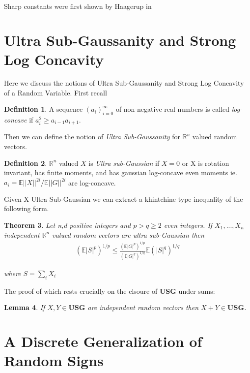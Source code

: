 \documentclass[10pt]{article}
\newcommand{\E}{\mathbb{E}}
\newcommand{\1}{\textbf{1}}
\newcommand{\R}{\mathbb{R}}
\newcommand{\norm}[1]{||#1||}
\newtheorem{theorem}{Theorem}
\newtheorem{lemma}[theorem]{Lemma}
\theoremstyle{remark}
\theoremstyle{definition}
\newtheorem{defn}[theorem]{Definition}
\begin{document}
Sharp constants were first shown by Haagerup in \cite{H}



\section{Ultra Sub-Gaussanity and Strong Log Concavity}

Here we discuss the notions of Ultra Sub-Gaussanity and Strong Log Concavity of a Random Variable. First recall

\begin{defn}
	A sequence $(a_i)_{i=0}^{\infty}$ of non-negative real numbers is called \textit{log-concave} if $a_i^2 \geq a_{i-1}a_{i+1}$.
\end{defn}

Then we can define the notion of \textit{Ultra Sub-Gaussanity} for $\R^n$ valued random vectors.

\begin{defn}
	$\R^n$ valued $X$ is \textit{Ultra sub-Gaussian} if $X=0$ or X is rotation invariant, has finite moments, and has gaussian log-concave even moments ie. $a_i = \E \norm{X}^{2i}/\E \norm{G}^{2i}$ are log-concave.
\end{defn}

Given X Ultra Sub-Gaussian we can extract a khintchine type inequality of the following form.

\begin{theorem}
	Let n,d positive integers and $p > q \geq 2$ even integers. If $X_1,...,X_n$ independent $\R^n$ valued random vectors are ultra sub-Gaussian then
	\begin{align*}
		(\E |S|^p)^{1/p} \leq \frac{(\E|G|^p)^{1/p}}{(\E|G|^q)^{1/q}}\E (|S|^q)^{1/q}
	\end{align*}

	where $S = \sum_i X_i$
\end{theorem}

The proof of which rests crucially on the clsoure of \textbf{USG} under sums:

\begin{lemma}
	If $X,Y \in \textbf{USG}$ are independent random vectors then $X+Y \in \textbf{USG}$.
\end{lemma}

\section{A Discrete Generalization of Random Signs}
\end{document}

